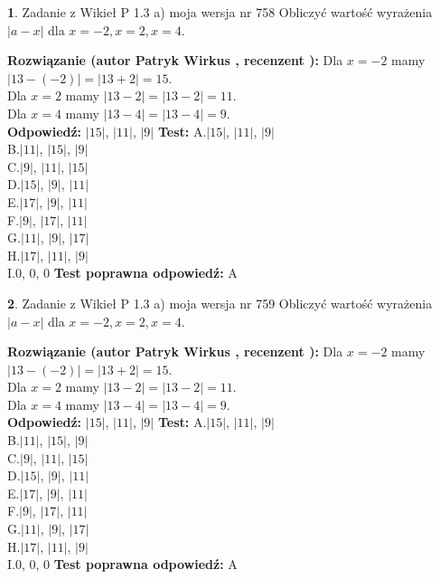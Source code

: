 \documentclass[12pt, a4paper]{article}
\theoremstyle{definition} %
\newtheorem{zad}{}
\newcommand{\zadStart}[1]{\begin{zad}#1\newline}
\newcommand{\zadStop}{\end{zad}}
\newcommand{\rozwStart}[2]{\noindent \textbf{Rozwiązanie (autor #1 , recenzent #2): }\newline}
\newcommand{\rozwStop}{\newline}
\newcommand{\odpStart}{\noindent \textbf{Odpowiedź:}\newline}
\newcommand{\odpStop}{\newline}
\newcommand{\testStart}{\noindent \textbf{Test:}\newline}
\newcommand{\testStop}{\newline}
\newcommand{\kluczStart}{\noindent \textbf{Test poprawna odpowiedź:}\newline}
\newcommand{\kluczStop}{\newline}
\begin{document}
\zadStart{Zadanie z Wikieł P 1.3 a) moja wersja nr 758}
Obliczyć wartość wyrażenia $|a - x|$ dla $x=-2,x=2,x=4$.
\zadStop
\rozwStart{Patryk Wirkus}{}
Dla $x = -2$ mamy $|13 - (-2)| = |13 + 2| = 15$.\\
Dla $x = 2$ mamy $|13 - 2| = |13 - 2| = 11$.\\
Dla $x = 4$ mamy $|13 - 4| = |13 - 4| = 9$.\\
\rozwStop
\odpStart
$|15|$, $|11|$, $|9|$
\odpStop
\testStart
A.$|15|$, $|11|$, $|9|$\\
B.$|11|$, $|15|$, $|9|$\\
C.$|9|$, $|11|$, $|15|$\\
D.$|15|$, $|9|$, $|11|$\\
E.$|17|$, $|9|$, $|11|$\\
F.$|9|$, $|17|$, $|11|$\\
G.$|11|$, $|9|$, $|17|$\\
H.$|17|$, $|11|$, $|9|$\\
I.$0$, $0$, $0$
\testStop
\kluczStart
A
\kluczStop



\zadStart{Zadanie z Wikieł P 1.3 a) moja wersja nr 759}
Obliczyć wartość wyrażenia $|a - x|$ dla $x=-2,x=2,x=4$.
\zadStop
\rozwStart{Patryk Wirkus}{}
Dla $x = -2$ mamy $|13 - (-2)| = |13 + 2| = 15$.\\
Dla $x = 2$ mamy $|13 - 2| = |13 - 2| = 11$.\\
Dla $x = 4$ mamy $|13 - 4| = |13 - 4| = 9$.\\
\rozwStop
\odpStart
$|15|$, $|11|$, $|9|$
\odpStop
\testStart
A.$|15|$, $|11|$, $|9|$\\
B.$|11|$, $|15|$, $|9|$\\
C.$|9|$, $|11|$, $|15|$\\
D.$|15|$, $|9|$, $|11|$\\
E.$|17|$, $|9|$, $|11|$\\
F.$|9|$, $|17|$, $|11|$\\
G.$|11|$, $|9|$, $|17|$\\
H.$|17|$, $|11|$, $|9|$\\
I.$0$, $0$, $0$
\testStop
\kluczStart
A
\kluczStop
\end{document}
